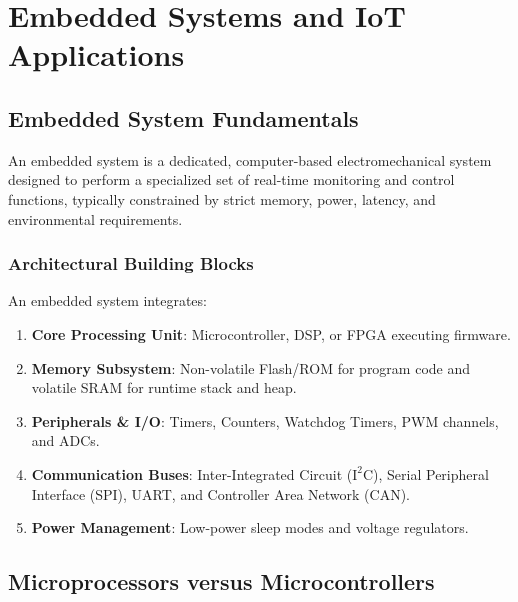 \chapter{Embedded Systems and IoT Applications}
\label{chap:embedded}

\section{Embedded System Fundamentals}
An embedded system is a dedicated, computer-based electromechanical system designed to perform a specialized set of real-time monitoring and control functions, typically constrained by strict memory, power, latency, and environmental requirements.

\subsection{Architectural Building Blocks}
An embedded system integrates:
\begin{enumerate}[leftmargin=1.5em]
    \item \textbf{Core Processing Unit}: Microcontroller, DSP, or FPGA executing firmware.
    \item \textbf{Memory Subsystem}: Non-volatile Flash/ROM for program code and volatile SRAM for runtime stack and heap.
    \item \textbf{Peripherals \& I/O}: Timers, Counters, Watchdog Timers, PWM channels, and ADCs.
    \item \textbf{Communication Buses}: Inter-Integrated Circuit ($\text{I}^2\text{C}$), Serial Peripheral Interface (SPI), UART, and Controller Area Network (CAN).
    \item \textbf{Power Management}: Low-power sleep modes and voltage regulators.
\end{enumerate}

\section{Microprocessors versus Microcontrollers}


